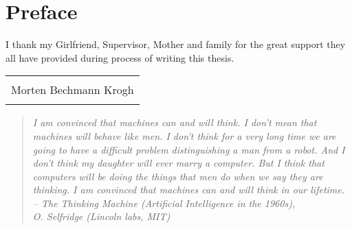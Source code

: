 \chapter*{Preface}
I thank my Girlfriend, Supervisor, Mother and family for the great support they all have provided during process of writing this thesis.




\vspace{10cm}



\begin{table}
	\centering
		\begin{tabular}{c}
			\\
			\underline{\phantom{mmmmmmmmmmmmmmmmmmmmmmmmmmmmmmmmmmmmmmmmm}}  \\
			Morten Bechmann Krogh  \\
			\\
		\end{tabular}
\end{table}

\cleardoublepage


\begin{flushright}
\vspace*{8em}
\small{\begin{quotation}
\em %
I am convinced that machines can and will think. I don't mean that machines will behave like men. I don't think for a very long time we are going to have a difficult problem distinguishing a man from a robot. And I don't think my daughter will ever marry a computer. But I think that computers will be doing the things that men do when we say they are thinking. I am convinced that machines can and will think in our lifetime.\\
\medskip
\raggedleft
-- \textup{The Thinking Machine (Artificial Intelligence
            in the 1960s)}, \\ O. Selfridge (Lincoln labs, MIT)
\end{quotation}}
\end{flushright} 
\vspace*{\fill}

\begin{comment}

\begin{flushright}
\small\em{
\vspace{5cm}
Essentially, \\
all models are wrong,\\
but some are useful
}
\end{flushright}
\begin{flushright}
\small{
George E. P. Box \\
\em{(1919 - 2013)}
}
\end{flushright} 
\end{comment}
